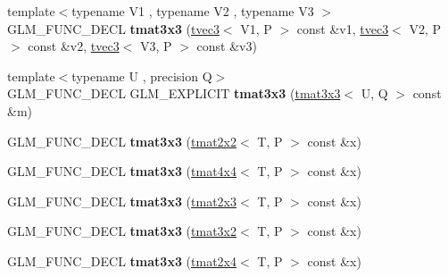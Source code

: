 \begin{DoxyCompactItemize}
\item 
\hypertarget{structglm_1_1tmat3x3_aa124ab387668b4444834f36fb7b02a9d}{{\footnotesize template$<$typename V1 , typename V2 , typename V3 $>$ }\\G\-L\-M\-\_\-\-F\-U\-N\-C\-\_\-\-D\-E\-C\-L {\bfseries tmat3x3} (\hyperlink{structglm_1_1tvec3}{tvec3}$<$ V1, P $>$ const \&v1, \hyperlink{structglm_1_1tvec3}{tvec3}$<$ V2, P $>$ const \&v2, \hyperlink{structglm_1_1tvec3}{tvec3}$<$ V3, P $>$ const \&v3)}\label{structglm_1_1tmat3x3_aa124ab387668b4444834f36fb7b02a9d}

\item 
\hypertarget{structglm_1_1tmat3x3_a7c44285c419a7485e7e558ee66c2a147}{{\footnotesize template$<$typename U , precision Q$>$ }\\G\-L\-M\-\_\-\-F\-U\-N\-C\-\_\-\-D\-E\-C\-L G\-L\-M\-\_\-\-E\-X\-P\-L\-I\-C\-I\-T {\bfseries tmat3x3} (\hyperlink{structglm_1_1tmat3x3}{tmat3x3}$<$ U, Q $>$ const \&m)}\label{structglm_1_1tmat3x3_a7c44285c419a7485e7e558ee66c2a147}

\item 
\hypertarget{structglm_1_1tmat3x3_ae07ead4a125f21a8be9c423c09434f93}{G\-L\-M\-\_\-\-F\-U\-N\-C\-\_\-\-D\-E\-C\-L {\bfseries tmat3x3} (\hyperlink{structglm_1_1tmat2x2}{tmat2x2}$<$ T, P $>$ const \&x)}\label{structglm_1_1tmat3x3_ae07ead4a125f21a8be9c423c09434f93}

\item 
\hypertarget{structglm_1_1tmat3x3_a802f89baac6ac79fe657088c95308c7b}{G\-L\-M\-\_\-\-F\-U\-N\-C\-\_\-\-D\-E\-C\-L {\bfseries tmat3x3} (\hyperlink{structglm_1_1tmat4x4}{tmat4x4}$<$ T, P $>$ const \&x)}\label{structglm_1_1tmat3x3_a802f89baac6ac79fe657088c95308c7b}

\item 
\hypertarget{structglm_1_1tmat3x3_aedf6749905c8adde35f51c14c50197db}{G\-L\-M\-\_\-\-F\-U\-N\-C\-\_\-\-D\-E\-C\-L {\bfseries tmat3x3} (\hyperlink{structglm_1_1tmat2x3}{tmat2x3}$<$ T, P $>$ const \&x)}\label{structglm_1_1tmat3x3_aedf6749905c8adde35f51c14c50197db}

\item 
\hypertarget{structglm_1_1tmat3x3_a69d122cdc832030b626f7a34524216b0}{G\-L\-M\-\_\-\-F\-U\-N\-C\-\_\-\-D\-E\-C\-L {\bfseries tmat3x3} (\hyperlink{structglm_1_1tmat3x2}{tmat3x2}$<$ T, P $>$ const \&x)}\label{structglm_1_1tmat3x3_a69d122cdc832030b626f7a34524216b0}

\item 
\hypertarget{structglm_1_1tmat3x3_a945eb750045d533d8d9a56eb76011cfe}{G\-L\-M\-\_\-\-F\-U\-N\-C\-\_\-\-D\-E\-C\-L {\bfseries tmat3x3} (\hyperlink{structglm_1_1tmat2x4}{tmat2x4}$<$ T, P $>$ const \&x)}\label{structglm_1_1tmat3x3_a945eb750045d533d8d9a56eb76011cfe}


\end{DoxyCompactItemize}
